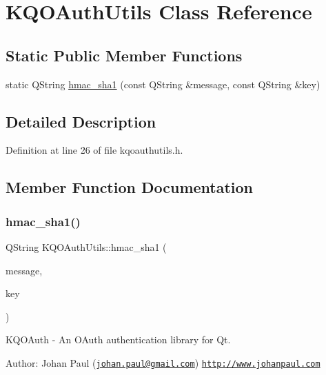 \hypertarget{class_k_q_o_auth_utils}{}\section{K\+Q\+O\+Auth\+Utils Class Reference}
\label{class_k_q_o_auth_utils}
\subsection*{Static Public Member Functions}
\begin{DoxyCompactItemize}
\item 
static Q\+String \hyperlink{class_k_q_o_auth_utils_a29f5041ff00cfb0ecbe595869f7dda4f}{hmac\+\_\+sha1} (const Q\+String \&message, const Q\+String \&key)
\end{DoxyCompactItemize}


\subsection{Detailed Description}


Definition at line 26 of file kqoauthutils.\+h.



\subsection{Member Function Documentation}
\mbox{\label{class_k_q_o_auth_utils_a29f5041ff00cfb0ecbe595869f7dda4f}} 
\subsubsection{\texorpdfstring{hmac\+\_\+sha1()}{hmac\_sha1()}}
{\footnotesize\ttfamily Q\+String K\+Q\+O\+Auth\+Utils\+::hmac\+\_\+sha1 (\begin{DoxyParamCaption}\item[{const Q\+String \&}]{message,  }\item[{const Q\+String \&}]{key }\end{DoxyParamCaption})\hspace{0.3cm}{\ttfamily [static]}}

K\+Q\+O\+Auth -\/ An O\+Auth authentication library for Qt.

Author\+: Johan Paul (\href{mailto:johan.paul@gmail.com}{\tt johan.\+paul@gmail.\+com}) \href{http://www.johanpaul.com}{\tt http\+://www.\+johanpaul.\+com}

